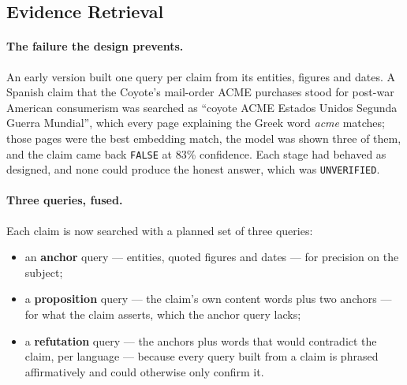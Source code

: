 
\subsection{Evidence Retrieval}
\label{subsec:evidence-retrieval}

\paragraph{The failure the design prevents.} An early version built one
query per claim from its entities, figures and dates. A Spanish claim
that the Coyote's mail-order ACME purchases stood for post-war American
consumerism was searched as ``coyote ACME Estados Unidos Segunda
Guerra Mundial'', which every page explaining the Greek word
\emph{acme} matches; those pages were the best embedding match, the
model was shown three of them, and the claim came back \texttt{FALSE}
at 83\% confidence. Each stage had behaved as designed, and none could
produce the honest answer, which was \texttt{UNVERIFIED}.

\paragraph{Three queries, fused.} Each claim is now searched with a
planned set of three queries:

\begin{itemize}
    \item an \textbf{anchor} query --- entities, quoted figures and
    dates --- for precision on the subject;
    \item a \textbf{proposition} query --- the claim's own content
    words plus two anchors --- for what the claim asserts, which the
    anchor query lacks;
    \item a \textbf{refutation} query --- the anchors plus words that
    would contradict the claim, per language --- because every query
    built from a claim is phrased affirmatively and could otherwise only
    confirm it.
\end{itemize}

